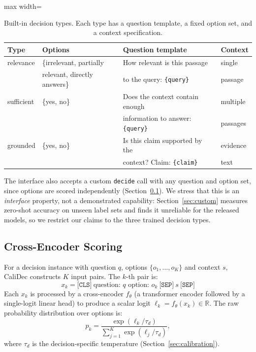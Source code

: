 \documentclass[twocolumn]{ICCKjournal}
\newcommand{\logit}{\ell}
\begin{document}
\begin{table}[H]
\caption{Built-in decision types. Each type has a question template, a fixed option set, and a context specification.}
\label{tab:decisions}
\centering
\small
\begin{adjustbox}{max width=\linewidth}
\begin{tabular}{llll}
\toprule
\textbf{Type} & \textbf{Options} & \textbf{Question template} & \textbf{Context} \\
\midrule
relevance & \{irrelevant, partially & How relevant is this passage & single \\
 & relevant, directly answers\} & to the query: \texttt{\{query\}} & passage \\
\addlinespace
sufficient & \{yes, no\} & Does the context contain enough & multiple \\
 & & information to answer: \texttt{\{query\}} & passages \\
\addlinespace
grounded & \{yes, no\} & Is this claim supported by the & evidence \\
 & & context? Claim: \texttt{\{claim\}} & text \\
\bottomrule
\end{tabular}
\end{adjustbox}
\end{table}

The interface also accepts a custom \texttt{decide} call with any question and option set, since options are scored independently (Section~\ref{sec:model}). We stress that this is an \emph{interface} property, not a demonstrated capability: Section~\ref{sec:custom} measures zero-shot accuracy on unseen label sets and finds it unreliable for the released models, so we restrict our claims to the three trained decision types.

\subsection{Cross-Encoder Scoring}
\label{sec:model}
For a decision instance with question $q$, options $\{o_1, \dots, o_K\}$ and context $s$, CaliDec constructs $K$ input pairs. The $k$-th pair is:
\begin{equation}
    x_k = \texttt{[CLS]}\ \text{question: } q \text{ option: } o_k\ \texttt{[SEP]}\ s\ \texttt{[SEP]}
    \label{eq:input}
\end{equation}
Each $x_k$ is processed by a cross-encoder $f_\theta$ (a transformer encoder followed by a single-logit linear head) to produce a scalar logit $\logit_k = f_\theta(x_k) \in \mathbb{R}$. The raw probability distribution over options is:
\begin{equation}
    p_k = \frac{\exp(\logit_k / \tau_d)}{\sum_{j=1}^{K} \exp(\logit_j / \tau_d)},
    \label{eq:softmax}
\end{equation}
where $\tau_d$ is the decision-specific temperature (Section~\ref{sec:calibration}).
\end{document}
